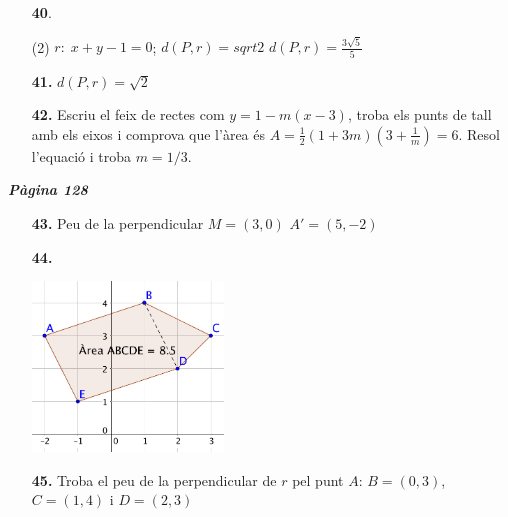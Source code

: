 \documentclass[a4paper, pdf, twoside]{book}
\begin{document}
\begin{multicols}{2}
\begin{enumerate}

 \item[\fontfamily{phv}\selectfont\color{blue}\textbf{40}. ] 
 \begin{tasks}[column-sep=1em, item-indent=1.3333em](2)
	 \task* $r:\;x+y-1=0$; $d(P,r)=sqrt{2}$
	 \task $d(P,r)=\frac {3\sqrt {5}}{5}$
\end{tasks}
\vspace{0.25cm}
\item[\fontfamily{phv}\selectfont\color{blue}\textbf{41. }] 
$d(P,r)=\sqrt {2}$
\vspace{0.25cm}
\item[\fontfamily{phv}\selectfont\color{blue}\textbf{42. }]  \scalebox{0.6}{\simbolcompass } 
Escriu el feix de rectes com $y=1-m(x-3)$, troba els punts de tall amb els eixos i comprova que l'àrea és $A=\frac {1}{2}(1+3m)(3+\frac {1}{m})=6$. Resol l'equació i troba $m=1/3$.
 \end{enumerate}
\vspace{0.3cm}


{\textbf{\em Pàgina 128}} \hrulefill
\begin{enumerate}
\vspace{0.25cm}
\item[\fontfamily{phv}\selectfont\color{blue}\textbf{43. }] 
Peu de la perpendicular $M=(3,0)$ $A'=(5,-2)$
 \end{enumerate}
\begin{enumerate}
\vspace{0.25cm}
\item[\fontfamily{phv}\selectfont\color{blue}\textbf{44. }] 
\mbox {}\par \includegraphics [width=0.4\textwidth ]{img-sol/t9-40}
\vspace{0.25cm}
\item[\fontfamily{phv}\selectfont\color{blue}\textbf{45. }]  \scalebox{0.6}{\simbolcompass } 
Troba el peu de la perpendicular de $r$ pel punt $A$: $B=(0,3)$, $C=(1,4)$ i $D=(2,3)$ 
\vspace{0.25cm}



\end{enumerate}
\end{multicols}
\end{document}
